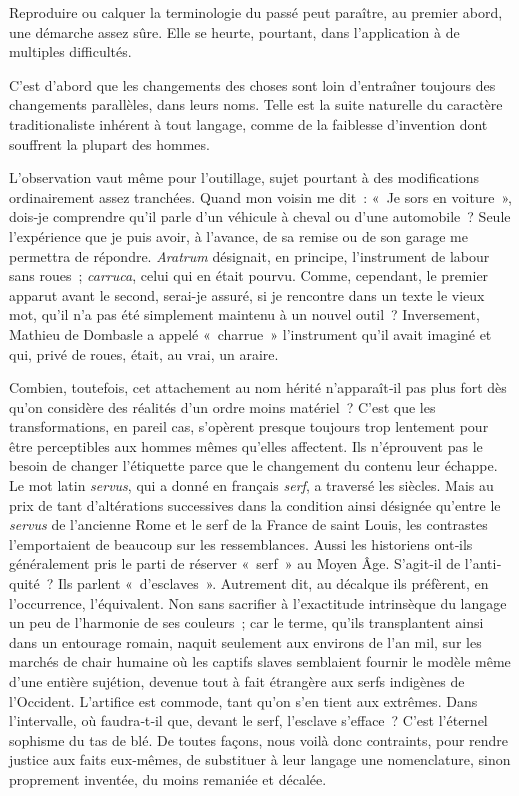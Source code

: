 \documentclass[french,twoside]{book} %
\begin{document}
\noindent Reproduire ou calquer la terminologie du passé peut paraître, au premier abord, une démarche assez sûre. Elle se heurte, pourtant, dans l’application à de multiples difficultés.\par
C’est d’abord que les changements des choses sont loin d’entraîner toujours des changements parallèles, dans leurs noms. Telle est la suite naturelle du caractère traditionaliste inhérent à tout langage, comme de la faiblesse d’invention dont souffrent la plupart des hommes.\par
L’observation vaut même pour l’outillage, sujet pourtant à des modi­fications ordinairement assez tranchées. Quand mon voisin me dit : « Je sors en voiture », dois‑je comprendre qu’il parle d’un véhicule à cheval ou d’une automobile ? Seule l’expérience que je puis avoir, à l’avance, de sa remise ou de son garage me permettra de répondre. \emph{Aratrum} dési­gnait, en principe, l’instrument de labour sans roues ; \emph{carruca}, celui qui en était pourvu. Comme, cependant, le premier apparut avant le second, serai-je assuré, si je rencontre dans un texte le vieux mot, qu’il n’a pas été simplement maintenu à un nouvel outil ? Inversement, Mathieu de Dombasle a appelé « charrue » l’instrument qu’il avait imaginé et qui, privé de roues, était, au vrai, un araire.\par
\label{p81} Combien, toutefois, cet attachement au nom hérité n’apparaît‑il pas plus fort dès qu’on considère des réalités d’un ordre moins matériel ? C’est que les transformations, en pareil cas, s’opèrent presque toujours trop lentement pour être perceptibles aux hommes mêmes qu’elles affectent. Ils n’éprouvent pas le besoin de changer l’étiquette parce que le change­ment du contenu leur échappe. Le mot latin \emph{servus}, qui a donné en fran­çais \emph{serf}, a traversé les siècles. Mais au prix de tant d’altérations succes­sives dans la condition ainsi désignée qu’entre le \emph{servus} de l’ancienne Rome et le serf de la France de saint Louis, les contrastes l’emportaient de beaucoup sur les ressemblances. Aussi les historiens ont‑ils générale­ment pris le parti de réserver « serf » au Moyen Âge. S’agit‑il de l’anti­quité ? Ils parlent « d’esclaves ». Autrement dit, au décalque ils pré­fèrent, en l’occurrence, l’équivalent. Non sans sacrifier à l’exactitude intrinsèque du langage un peu de l’harmonie de ses couleurs ; car le terme, qu’ils transplantent ainsi dans un entourage romain, naquit seulement aux environs de l’an mil, sur les marchés de chair humaine où les captifs slaves semblaient fournir le modèle même d’une entière sujétion, devenue tout à fait étrangère aux serfs indigènes de l’Occident. L’artifice est com­mode, tant qu’on s’en tient aux extrêmes. Dans l’intervalle, où faudra‑t‑il que, devant le serf, l’esclave s’efface ? C’est l’éternel sophisme du tas de blé. De toutes façons, nous voilà donc contraints, pour rendre justice aux faits eux‑mêmes, de substituer à leur langage une nomenclature, sinon proprement inventée, du moins remaniée et décalée.\par
\end{document}
